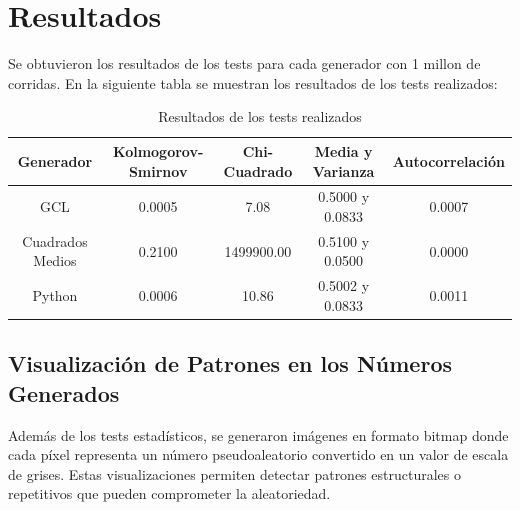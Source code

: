 \documentclass{article}
\begin{document}
\section{Resultados}
Se obtuvieron los resultados de los tests para cada generador con 1 millon de corridas. En la siguiente tabla se muestran los resultados de los tests realizados:
\begin{table}[H]
    \centering
    \begin{tabular}{@{}ccccc@{}}
        \toprule
        Generador & Kolmogorov-Smirnov & Chi-Cuadrado & Media y Varianza & Autocorrelación \\ \midrule
        GCL       & 0.0005                      & 7.08                & 0.5000 y 0.0833    & 0.0007\\
        Cuadrados Medios & 0.2100             & 1499900.00              & 0.5100 y 0.0500               & 0.0000  \\
        Python    & 0.0006                      & 10.86              & 0.5002 y 0.0833               & 0.0011  \\ \bottomrule
    \end{tabular}
    \caption{Resultados de los tests realizados}
    \label{tab:resultados}
\end{table}

\subsection{Visualización de Patrones en los Números Generados}

Además de los tests estadísticos, se generaron imágenes en formato bitmap donde cada píxel representa un número pseudoaleatorio convertido en un valor de escala de grises. Estas visualizaciones permiten detectar patrones estructurales o repetitivos que pueden comprometer la aleatoriedad.
\end{document}
